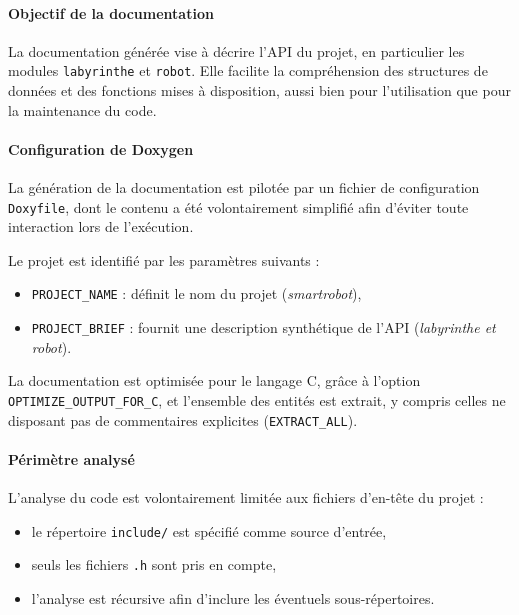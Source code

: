 \paragraph{Objectif de la documentation}

La documentation générée vise à décrire l’API du projet, en particulier
les modules \texttt{labyrinthe} et \texttt{robot}.
Elle facilite la compréhension des structures de données et des fonctions
mises à disposition, aussi bien pour l’utilisation que pour la maintenance
du code.



\paragraph{Configuration de Doxygen}

La génération de la documentation est pilotée par un fichier de configuration
\texttt{Doxyfile}, dont le contenu a été volontairement simplifié afin
d’éviter toute interaction lors de l’exécution.

Le projet est identifié par les paramètres suivants :
\begin{itemize}
    \item \texttt{PROJECT\_NAME} : définit le nom du projet (\textit{smartrobot}),
    \item \texttt{PROJECT\_BRIEF} : fournit une description synthétique de l’API
    (\textit{labyrinthe et robot}).
\end{itemize}

La documentation est optimisée pour le langage C, grâce à l’option
\texttt{OPTIMIZE\_OUTPUT\_FOR\_C}, et l’ensemble des entités est extrait,
y compris celles ne disposant pas de commentaires explicites
(\texttt{EXTRACT\_ALL}).



\paragraph{Périmètre analysé}

L’analyse du code est volontairement limitée aux fichiers d’en-tête
du projet :
\begin{itemize}
    \item le répertoire \texttt{include/} est spécifié comme source d’entrée,
    \item seuls les fichiers \texttt{.h} sont pris en compte,
    \item l’analyse est récursive afin d’inclure les éventuels sous-répertoires.
\end{itemize}

